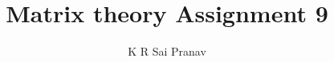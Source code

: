 \documentclass[journal,12pt,twocolumn]{IEEEtran}
\begin{document}
\makeatletter
{}
\makeatother
\let\StandardTheFigure\thefigure
\let\vec\mathbf
\renewcommand{\thefigure}{\theproblem}
\def\putbox#1#2#3{\makebox[0in][l]{\makebox[#1][l]{}\raisebox{\baselineskip}[0in][0in]{\raisebox{#2}[0in][0in]{#3}}}}
     \def\rightbox#1{\makebox[0in][r]{#1}}
     \def\centbox#1{\makebox[0in]{#1}}
     \def\topbox#1{\raisebox{-\baselineskip}[0in][0in]{#1}}
     \def\midbox#1{\raisebox{-0.5\baselineskip}[0in][0in]{#1}}
\vspace{3cm}
\title{Matrix theory Assignment 9}
\author{K R Sai Pranav}
%
%
%
% 
%
\end{document}
